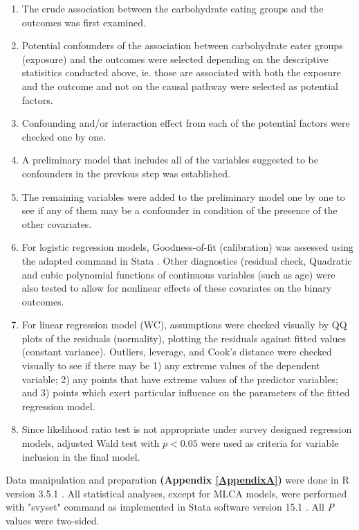 \begin{enumerate}
	\item The crude association between the carbohydrate eating groups and the outcomes was first examined. 
	\item Potential confounders of the association between carbohydrate eater groups (exposure) and the outcomes were selected depending on the descriptive statisitics conducted above, ie. those are associated with both the exposure and the outcome and not on the causal pathway were selected as potential factors. 
	\item Confounding and/or interaction effect from each of the potential factors were checked one by one. 
	\item A preliminary model that includes all of the variables suggested to be confounders in the previous step was established. 
	\item The remaining variables were added to the preliminary model one by one to see if any of them may be a confounder in condition of the presence of the other covariates. 
	\item For logistic regression models, Goodness-of-fit (calibration) was assessed using the adapted  command in Stata \parencite{archer2006goodness}. Other diagnostics (residual check,  Quadratic and cubic polynomial functions of continuous variables (such as age) were also tested to allow for nonlinear effects of these covariates on the binary outcomes. 
	
	\item For linear regression model (WC), assumptions were checked visually by QQ plots of the residuals (normality), plotting the residuals against fitted values (constant variance). Outliers, leverage, and Cook's distance were checked visually to see if there may be 1) any extreme values of the dependent variable; 2) any points that have extreme values of the predictor variables; and 3) points which exert particular influence on the parameters of the fitted regression model. 
	\item Since likelihood ratio test is not appropriate under survey designed regression models, adjusted Wald test with $p < 0.05$ were used as criteria for variable inclusion in the final model. 
\end{enumerate}

Data manipulation and preparation \textbf{(Appendix \ref{AppendixA})} were done in R version 3.5.1 \parencite{R3.5.1}. All statistical analyses, except for MLCA models, were performed with "svyset" command as implemented in Stata software version 15.1 \parencite{stata15}. All \textit{P} values were two-sided.
